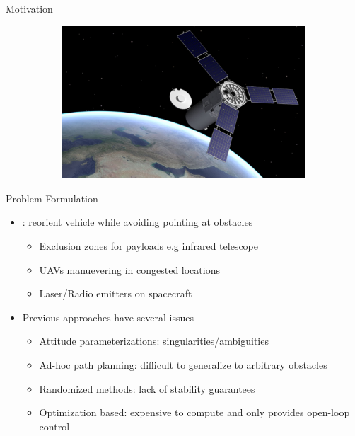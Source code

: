 \begin{frame}[t]{Motivation}
{\begin{figure}
\begin{subfigure}[b]{0.5\textwidth}
        \includegraphics[height=0.5\textheight]{figures/2016ACC/ors-1.png}
    \end{subfigure}
\end{figure}
}
\end{frame}   %


\begin{frame}[t]{Problem Formulation} %
\begin{itemize}
    \item {} : reorient vehicle while avoiding pointing at obstacles
    \begin{itemize}
        \item Exclusion zones for payloads e.g infrared telescope
        \item UAVs manuevering in congested locations
        \item Laser/Radio emitters on spacecraft
    \end{itemize}
    \pause
    \vs
    \item Previous approaches have several issues
    \begin{itemize}
        \item Attitude parameterizations: singularities/ambiguities
        \item Ad-hoc path planning: difficult to generalize to arbitrary obstacles
        \item Randomized methods: lack of stability guarantees
        \item Optimization based: expensive to compute and only provides open-loop control  
    \end{itemize}
\end{itemize}
\end{frame} %

